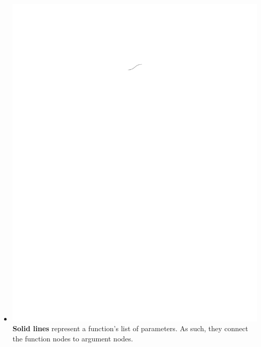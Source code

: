\documentclass[conference]{IEEEtran}
\begin{document}
\begin{itemize}
		\item  \vspace{.15cm} \includegraphics{glossary-solidline} \textbf{Solid
			lines} represent a function's list of parameters. As such, they connect the
		function nodes to argument nodes.
		

\end{itemize}
\end{document}
